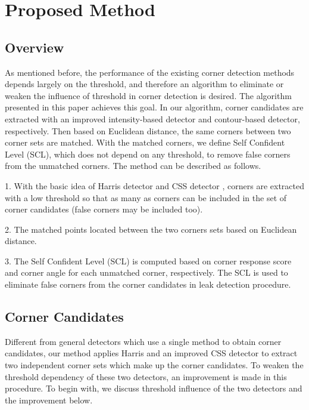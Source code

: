 \documentclass[letterpaper, 10 pt, conference]{ieeeconf}  %
\begin{document}
\section{Proposed Method}

\subsection{Overview}

As mentioned before, the performance of the existing corner detection methods depends largely on the threshold, and therefore an algorithm to eliminate or weaken the influence of threshold in corner detection is desired. The algorithm presented in this paper achieves this goal. In our algorithm, corner candidates are extracted with an improved intensity-based detector and contour-based detector, respectively. Then based on Euclidean distance, the same corners between two corner sets are matched. With the matched corners, we define Self Confident Level (SCL), which does not depend on any threshold, to remove false corners from the unmatched corners. The method can be described as follows.

1. With the basic idea of Harris detector \cite{Harris1988A} and CSS detector \cite{He2008Corner}\cite{Mokhtarian}, corners are extracted with a low threshold so that as many as corners can be included in the set of corner candidates (false corners may be included too). 

2. The matched points located between the two corners sets based on Euclidean distance. 

3. The Self Confident Level (SCL) is computed based on corner response score \cite{Harris1988A} and corner angle for each unmatched corner, respectively. The SCL is used to eliminate false corners from the corner candidates in leak detection procedure.

\subsection{Corner Candidates}
Different from general detectors which use a single method to obtain corner candidates, our method applies Harris and an improved CSS detector to extract two independent corner sets which make up the corner candidates. To weaken the threshold dependency of these two detectors, an improvement is made in this procedure. To begin with, we discuss threshold influence of the two detectors and the improvement below.
\end{document}
